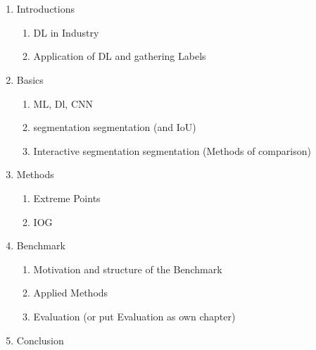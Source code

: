 \chapter{\abstractname}




\begin{enumerate}
	
	\item Introductions
	\begin{enumerate}
		\item DL in Industry
		\item Application of DL and gathering Labels
	\end{enumerate}
	
	\item Basics
	\begin{enumerate}
		\item ML, Dl, CNN
		\item segmentation segmentation (and IoU)
		\item Interactive segmentation segmentation (Methods of comparison)
	\end{enumerate}
	
	
	\item Methods
	\begin{enumerate}
		\item Extreme Points
		\item IOG
	\end{enumerate}
	
	
	\item Benchmark
	\begin{enumerate}
		\item Motivation and structure of the Benchmark
		\item Applied Methods
		\item Evaluation (or put Evaluation as own chapter)
	\end{enumerate}
	
	
	\item Conclusion
	
\end{enumerate}
